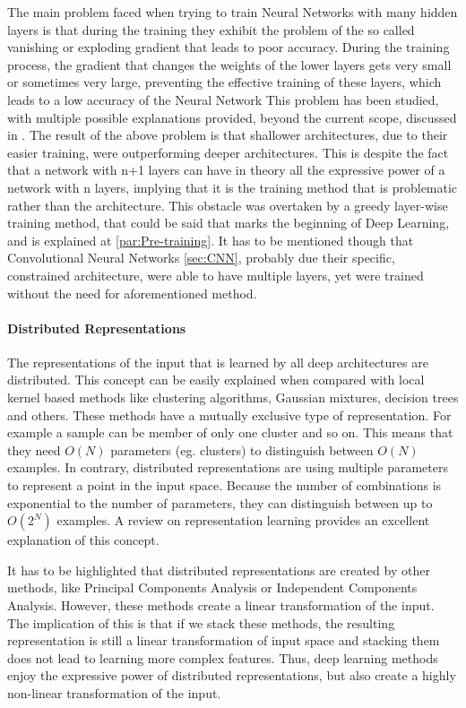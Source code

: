 \documentclass[a4paper]{article}
\begin{document}
		The main problem faced when trying to train Neural Networks with many hidden layers is that during the training they exhibit the problem of the so called vanishing or exploding gradient that leads to poor accuracy. During the training process, the gradient that changes the weights of the lower layers gets very small or sometimes very large, preventing the effective training of these layers, which leads to a low accuracy of the Neural Network \cite{Bengio2009} This problem has been studied, with multiple possible explanations provided, beyond the current scope, discussed in \cite{Bengio2007}. The result of the above problem is that shallower architectures, due to their easier training, were outperforming deeper architectures. This is despite the fact that a network with n+1 layers can have in theory all the expressive power of a network with n layers, implying that it is the training method that is problematic rather than the architecture. This obstacle was overtaken by a greedy layer-wise training method, that could be said that marks the beginning of Deep Learning, and is explained at \ref{par:Pre-training}. It has to be mentioned though that Convolutional Neural Networks \ref{sec:CNN}, probably due their specific, constrained architecture, were able to have multiple layers, yet were trained without the need for aforementioned method.
	
	\paragraph{Distributed Representations}
		The representations of the input that is learned by all deep architectures are distributed. This concept can be easily explained when compared with local kernel based methods like clustering algorithms, Gaussian mixtures, decision trees and others. These methods have a mutually exclusive type of representation. For example a sample can be  member of only one cluster and so on. This means that they need $O(N)$ parameters (eg. clusters) to distinguish between $O(N)$ examples. In contrary, distributed representations are using multiple parameters to represent a point in the input space. Because the number of combinations is exponential to the number of parameters, they can distinguish between up to $O(2^N)$ examples. A review on representation learning \cite{Bengio2013c} provides an excellent explanation of this concept.
		
		It has to be highlighted that distributed representations are created by other methods, like Principal Components Analysis or Independent Components Analysis. However, these methods create a linear transformation of the input. The implication of this is that if we stack these methods, the resulting representation is still a linear transformation of input space \cite{Bengio2007} and stacking them does not lead to learning more complex features. Thus, deep learning methods enjoy the expressive power of distributed representations, but also create a highly non-linear transformation of the input.
		
\end{document}
